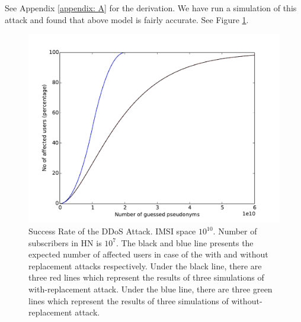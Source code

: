 \documentclass{llncs} %
\begin{document}
See Appendix \ref{appendix: A} for the derivation. We have run a simulation of this attack and found that above model is fairly accurate. See Figure \ref{fig:simulation_and_modeling}.

\begin{figure}[]
  \centering
    \includegraphics[width=\textwidth]{sim_and_mod.pdf}
  \caption{Success Rate of the DDoS Attack. IMSI space $10^{10}$. Number of subscribers in HN is $10^7$. The black and blue line presents the expected number of affected users in case of the with and without replacement attacks respectively. Under the black line, there are three red lines which represent the results of three simulations of with-replacement attack. Under the blue line, there are three green lines which represent the results of three simulations of without-replacement attack.}
  \label{fig:simulation_and_modeling}	
\end{figure}
\end{document}
